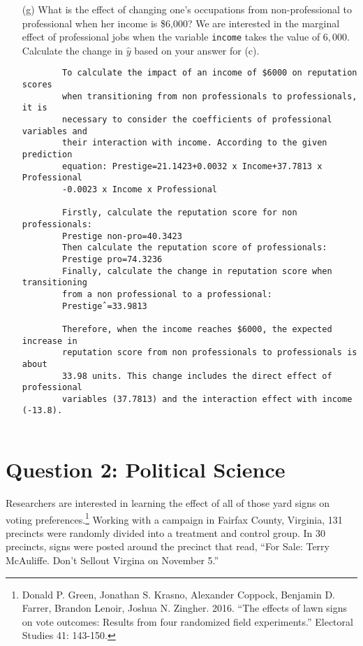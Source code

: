 \documentclass[12pt,letterpaper]{article}
\begin{document}
\begin{enumerate}
\begin{verbatim}
		In this equation, the coefficient of income is 0.0009, which means 
		that for every $1 increase in income, the expected reputation score 
		of professionals increases by 0.0009 units. Therefore, for an 
		increase in income of $1000, the expected increase in reputation 
		score is: yˆ=0.0009 × 1000=0.9
		
		So, for professionals, an increase of $1000 in income is expected to 
		increase their reputation score by 0.9 units.
	\end{verbatim}
	\newpage
	\item [(g)]
	What is the effect of changing one's occupations from non-professional to professional when her income is \$6,000? We are interested in the marginal effect of professional jobs when the variable \texttt{income} takes the value of $6,000$. Calculate the change in $\hat{y}$ based on your answer for (c).
	\begin{verbatim}
		To calculate the impact of an income of $6000 on reputation scores 
		when transitioning from non professionals to professionals, it is 
		necessary to consider the coefficients of professional variables and 
		their interaction with income. According to the given prediction 
		equation: Prestige=21.1423+0.0032 x Income+37.7813 x Professional 
		-0.0023 x Income x Professional
		
		Firstly, calculate the reputation score for non professionals:
		Prestige non-pro=40.3423
		Then calculate the reputation score of professionals:
		Prestige pro=74.3236
		Finally, calculate the change in reputation score when transitioning 
		from a non professional to a professional:
		Prestigeˆ=33.9813
		
		Therefore, when the income reaches $6000, the expected increase in 
		reputation score from non professionals to professionals is about 
		33.98 units. This change includes the direct effect of professional 
		variables (37.7813) and the interaction effect with income (-13.8).
		
	\end{verbatim}
	
\end{enumerate}

\newpage

\section*{Question 2: Political Science}
\vspace{.25cm}
\noindent 	Researchers are interested in learning the effect of all of those yard signs on voting preferences.\footnote{Donald P. Green, Jonathan	S. Krasno, Alexander Coppock, Benjamin D. Farrer,	Brandon Lenoir, Joshua N. Zingher. 2016. ``The effects of lawn signs on vote outcomes: Results from four randomized field experiments.'' Electoral Studies 41: 143-150. } Working with a campaign in Fairfax County, Virginia, 131 precincts were randomly divided into a treatment and control group. In 30 precincts, signs were posted around the precinct that read, ``For Sale: Terry McAuliffe. Don't Sellout Virgina on November 5.'' \\
\end{document}
